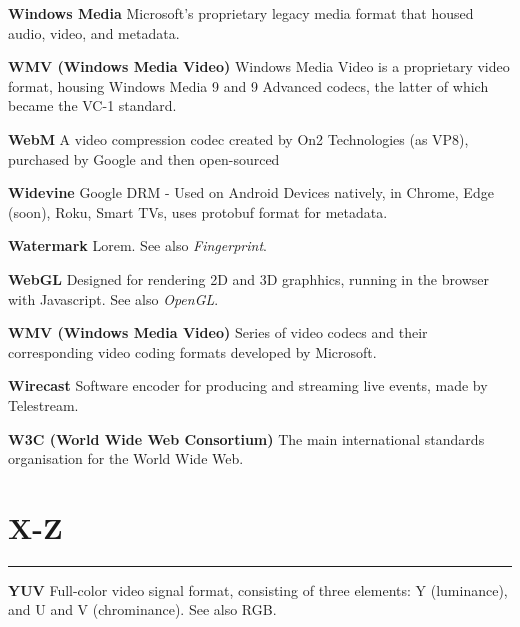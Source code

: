 \smallskip
\textbf{Windows Media}
Microsoft's proprietary legacy media format that housed audio, video, and metadata.

\smallskip
\textbf{WMV (Windows Media Video)}
Windows Media Video is a proprietary video format, housing Windows Media 9 and 9 Advanced codecs, the latter of which became the VC-1 standard.

\smallskip
\textbf{WebM}
A video compression codec created by On2 Technologies (as VP8), purchased by Google and then open-sourced

\smallskip
\textbf{Widevine}
Google DRM - Used on Android Devices natively, in Chrome, Edge (soon), Roku, Smart TVs, uses protobuf format for metadata.

\smallskip
\textbf{Watermark}
Lorem. See also \textit{Fingerprint}.

\smallskip
\textbf{WebGL}
Designed for rendering 2D and 3D graphhics, running in the browser with Javascript. See also \textit{OpenGL}.

\smallskip
\textbf{WMV (Windows Media Video)}
Series of video codecs and their corresponding video coding formats developed by Microsoft.

\smallskip
\textbf{Wirecast}
Software encoder for producing and streaming live events, made by Telestream.

\smallskip
\textbf{W3C (World Wide Web Consortium)}
The main international standards organisation for the World Wide Web.

\section{X-Z}
\hrule

\medskip
\textbf{YUV}
Full-color video signal format, consisting of three elements: Y (luminance), and U and V (chrominance). See also RGB.
